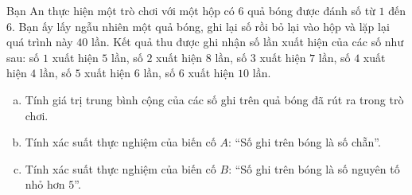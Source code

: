 \begin{bt}%
Bạn An thực hiện một trò chơi với một hộp có $6$ quả bóng được đánh số từ $1$ đến $6$. Bạn ấy lấy ngẫu nhiên một quả bóng, ghi lại số rồi bỏ lại vào hộp và lặp lại quá trình này $40$ lần. Kết quả thu được ghi nhận số lần xuất hiện của các số như sau: số $1$ xuất hiện $5$ lần, số $2$ xuất hiện $8$ lần, số $3$ xuất hiện $7$ lần, số $4$ xuất hiện $4$ lần, số $5$ xuất hiện $6$ lần, số $6$ xuất hiện $10$ lần.
\begin{enumerate}[a)]
	\item Tính giá trị trung bình cộng của các số ghi trên quả bóng đã rút ra trong trò chơi.
	\item Tính xác suất thực nghiệm của biến cố $A$: ``Số ghi trên bóng là số chẵn''.
	\item Tính xác suất thực nghiệm của biến cố $B$: ``Số ghi trên bóng là số nguyên tố nhỏ hơn $5$''.
\end{enumerate}
\end{bt}

